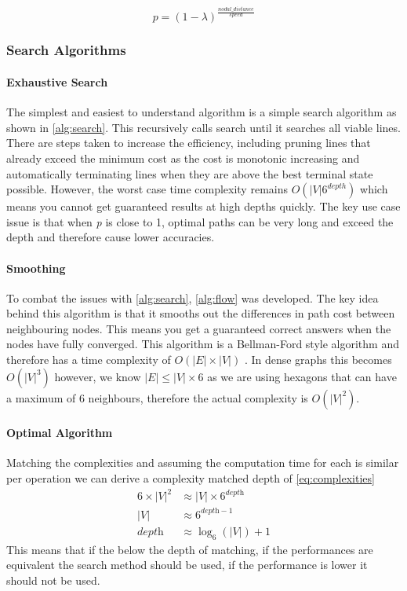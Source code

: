 \begin{equation}\label{eq:p calc}
    p = (1-\lambda)^{\frac{nodal\_distance}{speed}}
\end{equation}

\subsubsection{Search Algorithms}


\paragraph{Exhaustive Search}
The simplest and easiest to understand algorithm is a simple search algorithm as shown in \ref{alg:search}. This recursively calls search until it searches all viable lines. There are steps taken to increase the efficiency, including pruning lines that already exceed the minimum cost as the cost is monotonic increasing and automatically terminating lines when they are above the best terminal state possible. However, the worst case time complexity remains $O(|V|6^{depth})$ which means you cannot get guaranteed results at high depths quickly. The key use case issue is that when \textit{p} is close to 1, optimal paths can be very long and exceed the depth and therefore cause lower accuracies.
\paragraph{Smoothing}
To combat the issues with \ref{alg:search}, \ref{alg:flow} was developed. The key idea behind this algorithm is that it smooths out the differences in path cost between neighbouring nodes. This means you get a guaranteed correct answers when the nodes have fully converged. This algorithm is a Bellman-Ford style algorithm and therefore has a time complexity of $O(|E|\times |V|)$ \cite{REF}. In dense graphs this becomes  $O(|V|^3)$ however, we know $|E| \leq |V| \times 6$ as we are using hexagons that can have a maximum of 6 neighbours, therefore the actual complexity is $O(|V|^2)$. 

\paragraph{Optimal Algorithm}
Matching the complexities and assuming the computation time for each is similar per operation we can derive a complexity matched depth of \ref{eq:complexities}
\begin{align}\label{eq:complexities}
    6\times|V|^2 &\approx |V|\times6^{\textit{depth}} \nonumber \\
    |V| &\approx 6^{\textit{depth} - 1} \label{eq:vertex_depth} \\
    \textit{depth} &\approx \log_6(|V|) + 1 \nonumber
\end{align}
This means that if the below the depth of matching, if the performances are equivalent the search method should be used, if the performance is lower it should not be used.
